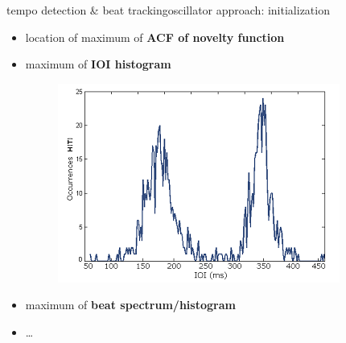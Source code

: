         \begin{frame}{tempo detection \& beat tracking}{oscillator approach: initialization}

            \begin{itemize}
                \item	location of maximum of \textbf{ACF of novelty function}
                \item<2->	maximum of \textbf{IOI histogram}
                    \begin{figure}
                        \centering
                            \includegraphics[scale=.3]{graph/ioi_hist}
                    \end{figure}
                \item<2->	maximum of \textbf{beat spectrum/histogram}
                \item<2->	\ldots
            \end{itemize}
        \end{frame}

